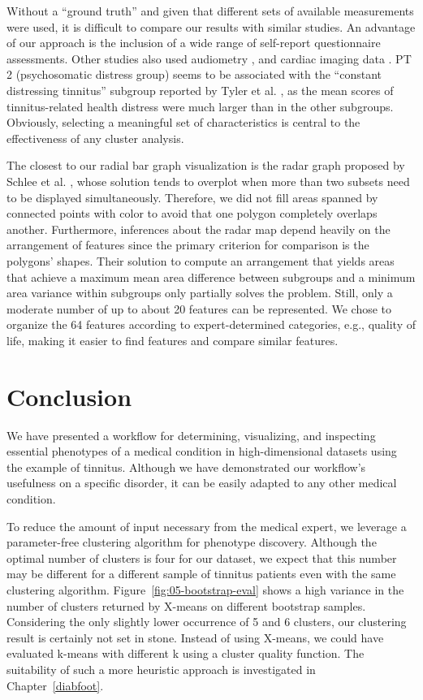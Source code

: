 \documentclass[
  oneside]{book}
\begin{document}
Without a ``ground truth'' and given that different sets of available measurements were used, it is difficult to compare our results with similar studies.
An advantage of our approach is the inclusion of a wide range of self-report questionnaire assessments.
Other studies also used audiometry \autocite{Tyler:TinnitusClustering2008,Langguth:LCA2017}, and cardiac imaging data \autocite{Schecklmann:BrainResearch2012}.
PT 2 (psychosomatic distress group) seems to be associated with the ``constant distressing tinnitus'' subgroup reported by Tyler et al. \autocite{Tyler:TinnitusClustering2008}, as the mean scores of tinnitus-related health distress were much larger than in the other subgroups.
Obviously, selecting a meaningful set of characteristics is central to the effectiveness of any cluster analysis.

The closest to our radial bar graph visualization is the radar graph proposed by Schlee et al. \autocite{Schlee:RadarVis2017}, whose solution tends to overplot when more than two subsets need to be displayed simultaneously.
Therefore, we did not fill areas spanned by connected points with color to
avoid that one polygon completely overlaps another.
Furthermore, inferences about the radar map \autocite{Schlee:RadarVis2017} depend heavily on the arrangement of features since the primary criterion for comparison is the polygons' shapes.
Their solution to compute an arrangement that yields areas that achieve a maximum mean area difference between subgroups and a minimum area variance within subgroups only partially solves the problem.
Still, only a moderate number of up to about 20 features can be represented.
We chose to organize the 64 features according to expert-determined categories, e.g., quality of life, making it easier to find features and compare similar features.

\hypertarget{phenotypes-conclusion}{%
\section{Conclusion}\label{phenotypes-conclusion}}

We have presented a workflow for determining, visualizing, and inspecting essential phenotypes of a medical condition in high-dimensional datasets using the example of tinnitus.
Although we have demonstrated our workflow's usefulness on a specific disorder, it can be easily adapted to any other medical condition.

To reduce the amount of input necessary from the medical expert, we leverage a parameter-free clustering algorithm for phenotype discovery.
Although the optimal number of clusters is four for our dataset, we expect that this number may be different for a different sample of tinnitus patients even with the same clustering algorithm.
Figure~\ref{fig:05-bootstrap-eval} shows a high variance in the number of clusters returned by X-means on different bootstrap samples.
Considering the only slightly lower occurrence of 5 and 6 clusters, our clustering result is certainly not set in stone.
Instead of using X-means, we could have evaluated k-means with different k using a cluster quality function.
The suitability of such a more heuristic approach is investigated in Chapter~\ref{diabfoot}.
\end{document}
